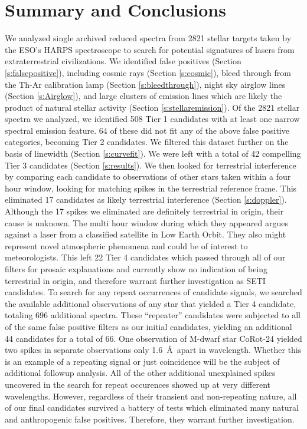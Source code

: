 \documentclass[twocolumn]{aastex701}
\begin{document}
\section{Summary and Conclusions}
We analyzed single archived reduced spectra from 2821 stellar targets taken by the ESO’s HARPS spectroscope to search for potential signatures of lasers from extraterrestrial civilizations. We identified false positives (Section \ref{s:falsepositive}), including cosmic rays (Section \ref{s:cosmic}), bleed through from the Th-Ar calibration lamp (Section \ref{s:bleedthrough}), night sky airglow lines (Section \ref{s:Airglow}), and large clusters of emission lines which are likely the product of natural stellar activity (Section \ref{s:stellaremission}). Of the 2821 stellar spectra we analyzed, we identified 508 Tier 1 candidates with at least one narrow spectral emission feature.  64 of these did not fit any of the above false positive categories, becoming Tier 2 candidates. We filtered this dataset further on the basis of linewidth (Section \ref{s:curvefit}). We were left with a total of 42 compelling Tier 3 candidates (Section \ref{s:results}). We then looked for terrestrial interference by comparing each candidate to observations of other stars taken within a four hour window, looking for matching spikes in the terrestrial reference frame.  This eliminated 17 candidates as likely terrestrial interference (Section \ref{s:doppler}). Although the 17 spikes we eliminated are definitely terrestrial in origin, their cause is unknown.  The multi hour window during which they appeared argues against a laser from a classified satellite in Low Earth Orbit. They also might represent novel atmospheric phenomena and could be of interest to meteorologists. This left 22 Tier 4 candidates which passed through all of our filters for prosaic explanations and currently show no indication of being terrestrial in origin, and therefore warrant further investigation as SETI candidates. To search for any repeat occurrences of candidate signals, we searched the available additional observations of any star that yielded a Tier 4 candidate, totaling 696 additional spectra. These \enquote{repeater} candidates were subjected to all of the same false positive filters as our initial candidates, yielding an additional 44 candidates for a total of 66. One observation of M-dwarf star CoRot-24 yielded two spikes in separate observations only 1.6~\AA~apart in wavelength. Whether this is an example of a repeating signal or just coincidence will be the subject of additional followup analysis. All of the other additional unexplained spikes uncovered in the search for repeat occurences showed up at very different wavelengths. However, regardless of their transient and non-repeating nature, all of our final candidates survived a battery of tests which eliminated many natural and anthropogenic false positives. Therefore, they warrant further investigation.
\end{document}

